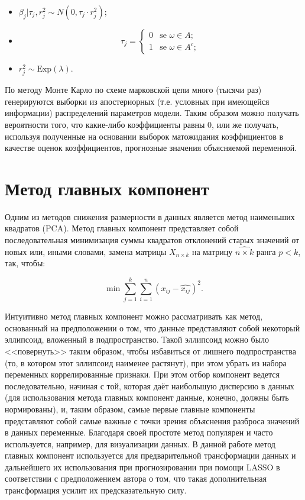         \begin{itemize}
        \item $\beta_j|\tau_j, r^2_j \sim N(0,\tau_j\cdot r^2_j )$;
        \item \begin{equation}
             \tau_j = 
 \begin{cases}
   0 &\text{se $\omega\in A$};\\
   1 &\text{se $\omega \in A^c$};
 \end{cases}
        \end{equation}
        \item $r^2_j \sim \text{Exp}(\lambda).$ 
    \end{itemize}
По методу Монте Карло по схеме марковской цепи много (тысячи раз) генерируются выборки из апостериорных (т.е. условных при имеющейся информации) распределений параметров модели. Таким образом можно получать вероятности того, что какие-либо коэффициенты равны 0, или же получать, используя полученные на основании выборок матожидания коэффициентов в качестве оценок коэффициентов, прогнозные значения объясняемой переменной.

\section{Метод главных компонент}
Одним из методов снижения размерности в данных является метод наименьших квадратов (PCA).
Метод главных компонент представляет собой последовательная минимизация суммы квадратов отклонений старых значений от новых или, иными словами, замена матрицы $X_{n \times k}$ на матрицу $\hat{{n \times k}}$ ранга $p < k$, так, чтобы:

\begin{equation}
    \min \sum_{j = 1}^k \sum_{i = 1}^{n}(x_{ij} - \hat{x_{ij}})^2.
\end{equation}

Интуитивно метод главных компонент можно рассматривать как метод, основанный на предположении о том, что данные представляют собой некоторый эллипсоид, вложенный в подпространство. Такой эллипсоид можно было <<повернуть>> таким образом, чтобы избавиться от лишнего подпространства (то, в котором этот эллипсоид наименее растянут), при этом убрать из набора переменных коррелированные признаки. При этом отбор компонент ведется последовательно, начиная с той, которая даёт наибольшую дисперсию в данных (для использования метода главных компонент данные, конечно, должны быть нормированы), и, таким образом, самые первые главные компоненты представляют собой самые важные с точки зрения объяснения разброса значений в данных переменные. 
Благодаря своей простоте метод популярен и часто используется, например, для визуализации данных. В данной работе метод главных компонент используется для предварительной трансформации данных и дальнейшего их использования при прогнозировании при помощи LASSO в соответствии с предположением автора о том, что такая дополнительная трансформация усилит их предсказательную силу.


